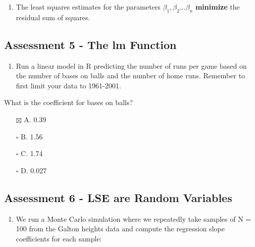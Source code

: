 \documentclass[
]{article}
\providecommand{\tightlist}{%
  \setlength{\itemsep}{0pt}\setlength{\parskip}{0pt}}
\begin{document}
\begin{enumerate}
\def\labelenumi{\arabic{enumi}.}
\setcounter{enumi}{1}
\tightlist
\item
  The least squares estimates for the parameters
  \(\beta_1,\beta_2...\beta_n\) \textbf{minimize} the residual sum of
  squares.
\end{enumerate}

\hypertarget{assessment-5---the-lm-function}{%
\subsection{Assessment 5 - The lm
Function}\label{assessment-5---the-lm-function}}

\begin{enumerate}
\def\labelenumi{\arabic{enumi}.}
\tightlist
\item
  Run a linear model in R predicting the number of runs per game based
  on the number of bases on balls and the number of home runs. Remember
  to first limit your data to 1961-2001.
\end{enumerate}

What is the coefficient for bases on balls?

\begin{itemize}
\tightlist
\item[$\boxtimes$]
  A. 0.39
\item[$\square$]
  B. 1.56
\item[$\square$]
  C. 1.74
\item[$\square$]
  D. 0.027
\end{itemize}

\hypertarget{assessment-6---lse-are-random-variables}{%
\subsection{Assessment 6 - LSE are Random
Variables}\label{assessment-6---lse-are-random-variables}}

\begin{enumerate}
\def\labelenumi{\arabic{enumi}.}
\tightlist
\item
  We run a Monte Carlo simulation where we repeatedly take samples of N
  = 100 from the Galton heights data and compute the regression slope
  coefficients for each sample:
\end{enumerate}
\end{document}
